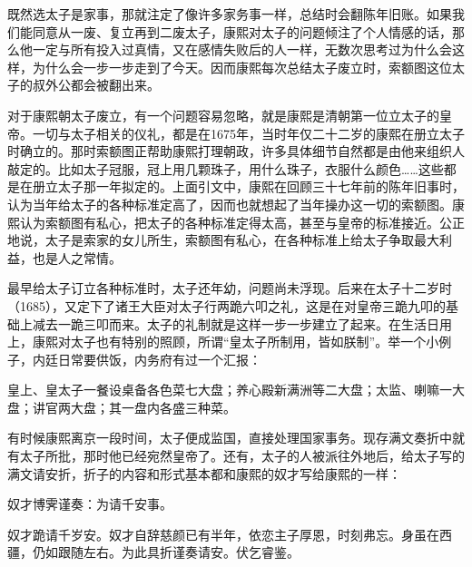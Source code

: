 
既然选太子是家事，那就注定了像许多家务事一样，总结时会翻陈年旧账。如果我们能同意从一废、复立再到二废太子，康熙对太子的问题倾注了个人情感的话，那么他一定与所有投入过真情，又在感情失败后的人一样，无数次思考过为什么会这样，为什么会一步一步走到了今天。因而康熙每次总结太子废立时，索额图这位太子的叔外公都会被翻出来。



对于康熙朝太子废立，有一个问题容易忽略，就是康熙是清朝第一位立太子的皇帝。一切与太子相关的仪礼，都是在1675年，当时年仅二十二岁的康熙在册立太子时确立的。那时索额图正帮助康熙打理朝政，许多具体细节自然都是由他来组织人敲定的。比如太子冠服，冠上用几颗珠子，用什么珠子，衣服什么颜色……这些都是在册立太子那一年拟定的。上面引文中，康熙在回顾三十七年前的陈年旧事时，认为当年给太子的各种标准定高了，因而也就想起了当年操办这一切的索额图。康熙认为索额图有私心，把太子的各种标准定得太高，甚至与皇帝的标准接近。公正地说，太子是索家的女儿所生，索额图有私心，在各种标准上给太子争取最大利益，也是人之常情。



最早给太子订立各种标准时，太子还年幼，问题尚未浮现。后来在太子十二岁时（1685），又定下了诸王大臣对太子行两跪六叩之礼，这是在对皇帝三跪九叩的基础上减去一跪三叩而来。太子的礼制就是这样一步一步建立了起来。在生活日用上，康熙对太子也有特别的照顾，所谓“皇太子所制用，皆如朕制”。举一个小例子，内廷日常要供饭，内务府有过一个汇报：



\begin{bookquote}皇上、皇太子一餐设桌备各色菜七大盘；养心殿新满洲等二大盘；太监、喇嘛一大盘；讲官两大盘；其一盘内各盛三种菜。\end{bookquote}


有时候康熙离京一段时间，太子便成监国，直接处理国家事务。现存满文奏折中就有太子所批，那时他已经宛然皇帝了。还有，太子的人被派往外地后，给太子写的满文请安折，折子的内容和形式基本都和康熙的奴才写给康熙的一样：



\begin{bookquote}奴才博霁谨奏：为请千安事。\end{bookquote}


\begin{bookquote}奴才跪请千岁安。奴才自辞慈颜已有半年，依恋主子厚恩，时刻弗忘。身虽在西疆，仍如跟随左右。为此具折谨奏请安。伏乞睿鉴。\end{bookquote}

